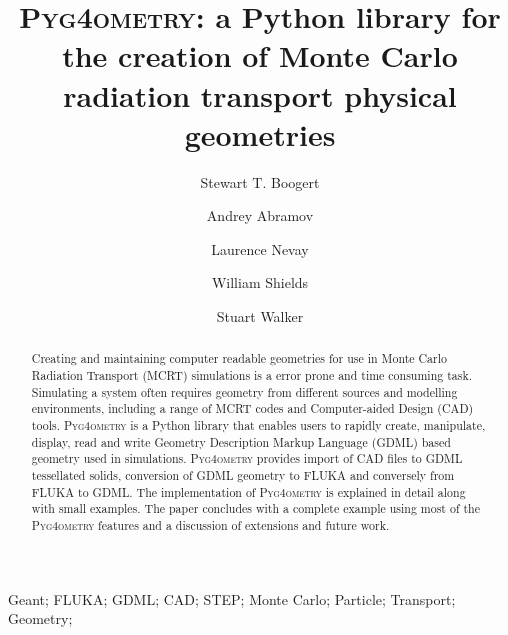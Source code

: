 \documentclass[final,5p,times,twocolumn]{elsarticle}
\newcommand{\PYGEOMETRY}{\textsc{Pyg4ometry}}
\begin{document}
\begin{frontmatter}



\title{\PYGEOMETRY{}: a Python library for the creation of Monte Carlo radiation transport physical geometries}


\author[a]{Stewart T. Boogert}
\author[a]{Andrey Abramov}
\author[a]{Laurence Nevay}
\author[a]{William Shields}
\author[a]{Stuart Walker}

\address[a]{John Adams Institute at Royal Holloway, Department of Physics, Royal Holloway, Egham, TW20 0EX, Surrey, UK}

\begin{abstract}
Creating and maintaining computer readable geometries for use in Monte Carlo Radiation Transport (MCRT) simulations is a 
error prone and time consuming task. Simulating a system often requires geometry from different sources and modelling 
environments, including a range of MCRT codes and Computer-aided Design (CAD) tools. \PYGEOMETRY{} is a Python library 
that enables users to rapidly create, manipulate, display, read and write Geometry Description Markup Language (GDML) based 
geometry used in simulations. \PYGEOMETRY{} provides import of CAD files to GDML tessellated solids, conversion of GDML geometry 
to FLUKA and conversely from FLUKA to GDML. The implementation of \PYGEOMETRY{} is explained in detail along with small  
examples. The paper concludes with a complete example using most of the \PYGEOMETRY{} features and a discussion of 
extensions and future work.
\end{abstract}

\begin{keyword}
Geant; FLUKA; GDML; CAD; STEP; Monte Carlo; Particle; Transport; Geometry; 

\end{keyword}

\end{frontmatter}
\end{document}
